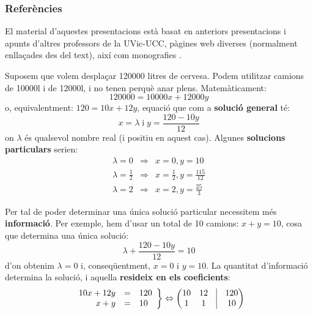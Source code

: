 \documentclass{beamer}
\begin{document}
\begin{frame}
\frametitle{Referències}
El material d'aquestes presentacions està basat en anteriors presentacions i apunts d'altres professors \cite{jlgarcia,mcorbera,mcalle} de la UVic-UCC, pàgines web diverses (normalment enllaçades des del text), així com monografies \cite{vanverth,schaum,riley}.
\end{frame}
\begin{frame}
Suposem que volem desplaçar 120000 litres de cervesa. Podem utilitzar camions de 10000l i de 12000l, i no tenen perquè anar plens. Matemàticament:
\[
120000=10000x+12000y
\]
o, equivalentment: $120=10x+12y$, equació que com a {\bf solució general} té:
\[
x=\lambda \; \mathrm{i} \; y=\frac{120-10y}{12}
\]
on $\lambda$ és qualsevol nombre real (i positiu en aquest cas). Algunes {\bf solucions particulars} serien:
\begin{eqnarray*}
  \lambda=0 & \Rightarrow &x=0, y=10 \\
  \lambda=\frac{1}{2} & \Rightarrow & x=\frac{1}{2}, y=\frac{115}{12}\\
  \lambda=2 & \Rightarrow & x=2, y=\frac{25}{3}
\end{eqnarray*}
\end{frame}

\begin{frame}
  Per tal de poder determinar una única solució particular necessitem més {\bf informació}. Per exemple, hem d'usar un total de 10 camions: $x+y=10$, cosa que determina una única solució:
  \[
    \lambda+\frac{120-10y}{12}=10
  \]
  d'on obtenim $\lambda=0$ i, conseqüentment, $x=0$ i $y=10$.
  La quantitat d'informació determina la solució, i aquella {\bf resideix en els coeficients}:
  \[
    \left.
    \begin{array}{rcl}10x+12y&=&120\\x+y&=&10\end{array}
    \right\}
    \Leftrightarrow
    \begin{pmatrix}
      10&12&\vrule&120\\1&1&\vrule&10
    \end{pmatrix}
  \]
\end{frame}
\end{document}
